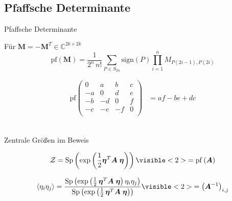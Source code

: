 \documentclass[11pt]{beamer}
\newcommand{\corr}[1]{\left\langle #1 \right\rangle}
\newcommand{\Sp}[1]{\mathrm{Sp}\left( #1 \right)}
\renewcommand{\exp}[1]{\mathrm{exp}\left( #1 \right)}
\newcommand{\sign}[1]{\mathrm{sign}\left( #1 \right)}
\newcommand{\pf}[1]{\mathrm{pf}\left( #1 \right)}
\begin{document}
\subsection{Pfaffsche Determinante}

    \begin{frame}{Pfaffsche Determinante}
    \begin{grayframe}[frametitle = {Definition}]
    Für $\bm{M} = -\bm{M}^T \in \mathbb{C}^{2k\times2k}$ \\
    \begin{equation} \nonumber
        \pf{\bm{M}} = \frac{1}{2^n\,n!} \sum_{P \in S_{2n}} \sign{P} \prod_{i=1}^n M_{P(2i-1),P(2i)} 
    \end{equation}
    \end{grayframe} 
    \vspace{0.5cm}
    \pause
    \begin{align}
    \pf{\begin{array}{cccc}  
        0  &  a  &  b & c \\
        -a &  0  &  d & e \\
        -b & -d  &  0 & f \\
        -c & -e  & -f & 0 \\
        \end{array}} &= af - be +dc \nonumber 
    \end{align}\\
    \end{frame}
    
    \begin{frame}{Zentrale Größen im Beweis}
    
    \begin{grayframe}[frametitle = {Graßmann Zustandssumme}]
    \begin{equation} \nonumber 
    \mathcal{Z} = \Sp{\exp{\frac{1}{2}\bm{\eta}^T \bm{A}\; \bm{\eta}}} \visible<2>{= \pf{\bm{A}}}
    \end{equation}
    \end{grayframe}
    \vspace{0.5cm}
    \begin{grayframe}[frametitle = {Graßmann Korrelation}]
    \begin{equation} \nonumber 
    \corr{\eta_{i}\eta_{j}} = \frac{ \Sp{\exp{\frac{1}{2}\,\bm{\eta}^T \bm{A}\; \bm{\eta}}\eta_{i}\eta_{j}}}{ \Sp{\exp{\frac{1}{2}\,\bm{\eta}^T \bm{A}\; \bm{\eta}}}} \visible<2>{= \left(\bm{A}^{-1}\right)_{i,j}}
    \end{equation}
    \end{grayframe}
    
    \end{frame}
    
\end{document}
